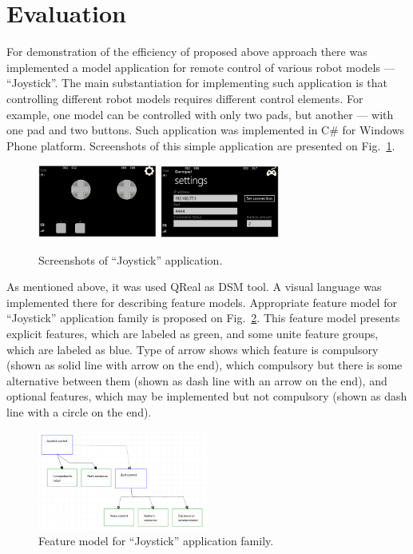 \documentclass[conference]{IEEEtran}
\begin{document}
\section{Evaluation}
\label{chapter:evaluation}
For demonstration of the efficiency of proposed above approach there was implemented a model application for remote control of various robot models --- ``Joystick''. The main substantiation for implementing such application is that controlling different robot models requires different control elements. For example, one model can be controlled with only two pads, but another --- with one pad and two buttons. Such application was implemented in C\# for Windows Phone platform. Screenshots of this simple application are presented on Fig.~\ref{image:joystick}. 

\begin{figure}[t]
	\centering
	\includegraphics[width=0.35\textwidth]{joystick1.png}
	\includegraphics[width=0.35\textwidth]{joystick2.png}
	\caption{Screenshots of ``Joystick'' application.}
	\label{image:joystick}
\end{figure}

As mentioned above, it was used QReal as DSM tool. A visual language was implemented there for describing feature models. Appropriate feature model for ``Joystick'' application family is proposed on Fig.~\ref{image:joystickFeatureModel}. This feature model presents explicit features, which are labeled as green, and some unite feature groups, which are labeled as blue. Type of arrow shows which feature is compulsory (shown as solid line with arrow on the end), which compulsory but there is some alternative between them (shown as dash line with an arrow on the end), and optional features, which may be implemented but not compulsory (shown as dash line with a circle on the end).

\begin{figure}[H]
	\centering
	\includegraphics[width=0.5\textwidth]{joystickFeatureModel.png}
	\caption{Feature model for ``Joystick'' application family.}
	\label{image:joystickFeatureModel}
\end{figure}
\end{document}
